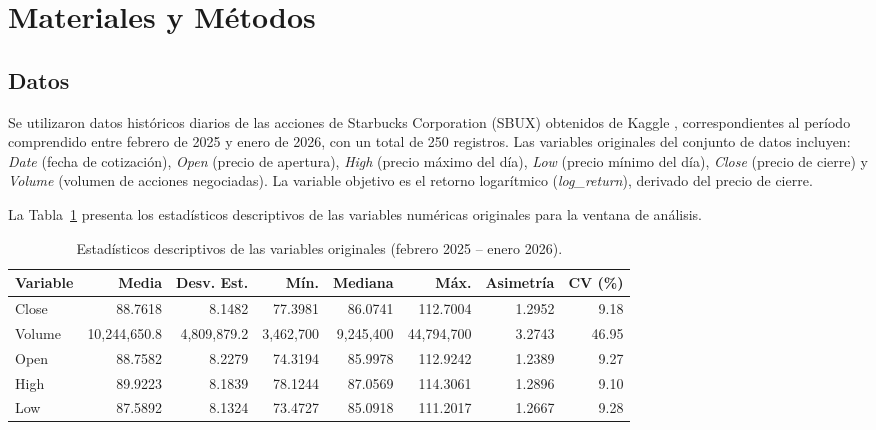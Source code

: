 \documentclass[12pt,a4paper]{article}
\begin{document}
\newpage

\section{Materiales y Métodos}
\label{sec:materiales}

\subsection{Datos}

Se utilizaron datos históricos diarios de las acciones de Starbucks Corporation (SBUX) obtenidos de Kaggle \cite{kaggle_sbux}, correspondientes al período comprendido entre febrero de 2025 y enero de 2026, con un total de 250 registros. Las variables originales del conjunto de datos incluyen: \textit{Date} (fecha de cotización), \textit{Open} (precio de apertura), \textit{High} (precio máximo del día), \textit{Low} (precio mínimo del día), \textit{Close} (precio de cierre) y \textit{Volume} (volumen de acciones negociadas). La variable objetivo es el retorno logarítmico (\textit{log\_return}), derivado del precio de cierre.

La Tabla~\ref{tab:estadisticos} presenta los estadísticos descriptivos de las variables numéricas originales para la ventana de análisis.

\begin{table}[H]
\centering
\caption{Estadísticos descriptivos de las variables originales (febrero 2025 -- enero 2026).}
\label{tab:estadisticos}
\small
\begin{tabular}{lrrrrrrr}
\toprule
\textbf{Variable} & \textbf{Media} & \textbf{Desv. Est.} & \textbf{Mín.} & \textbf{Mediana} & \textbf{Máx.} & \textbf{Asimetría} & \textbf{CV (\%)} \\
\midrule
Close   & 88.7618 & 8.1482 & 77.3981 & 86.0741 & 112.7004 & 1.2952 & 9.18 \\
Volume  & 10,244,650.8 & 4,809,879.2 & 3,462,700 & 9,245,400 & 44,794,700 & 3.2743 & 46.95 \\
Open    & 88.7582 & 8.2279 & 74.3194 & 85.9978 & 112.9242 & 1.2389 & 9.27 \\
High    & 89.9223 & 8.1839 & 78.1244 & 87.0569 & 114.3061 & 1.2896 & 9.10 \\
Low     & 87.5892 & 8.1324 & 73.4727 & 85.0918 & 111.2017 & 1.2667 & 9.28 \\
\bottomrule
\end{tabular}
\end{table}
\end{document}
